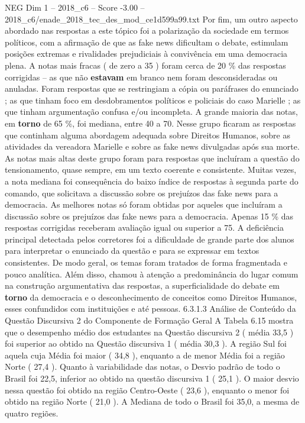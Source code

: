 \begin{textsample}{NEG Dim 1 – 2018\_c6 – Score -3.00 – 2018\_c6/enade\_2018\_tec\_des\_mod\_ce1d599a99.txt}
Por fim, um outro aspecto abordado nas respostas a este tópico foi a polarização da sociedade em termos políticos, com a afirmação de que as fake news dificultam o debate, estimulam posições extremas e rivalidades prejudiciais à convivência em uma democracia plena.
A notas mais fracas ( de zero a 35 ) foram cerca de 20 \% das respostas corrigidas – as que não \textbf{estavam} em branco nem foram desconsideradas ou anuladas.
Foram respostas que se restringiam a cópia ou paráfrases do enunciado ; as que tinham foco em desdobramentos políticos e policiais do caso Marielle ; as que tinham argumentação confusa e/ou incompleta.
A grande maioria das notas, em \textbf{torno} de 65 \%, foi mediana, entre 40 a 70.
Nesse grupo ficaram as respostas que continham alguma abordagem adequada sobre Direitos Humanos, sobre as atividades da vereadora Marielle e sobre as fake news divulgadas após sua morte.
As notas mais altas deste grupo foram para respostas que incluíram a questão do tensionamento, quase sempre, em um texto coerente e consistente.
Muitas vezes, a nota mediana foi consequência do baixo índice de respostas à segunda parte do comando, que solicitava a discussão sobre os prejuízos das fake news para a democracia.
As melhores notas só foram obtidas por aqueles que incluíram a discussão sobre os prejuízos das fake news para a democracia.
Apenas 15 \% das respostas corrigidas receberam avaliação igual ou superior a 75.
A deficiência principal detectada pelos corretores foi a dificuldade de grande parte dos alunos para interpretar o enunciado da questão e para se expressar em textos consistentes.
De modo geral, os temas foram tratados de forma fragmentada e pouco analítica.
Além disso, chamou à atenção a predominância do lugar comum na construção argumentativa das respostas, a superficialidade do debate em \textbf{torno} da democracia e o desconhecimento de conceitos como Direitos Humanos, esses confundidos com instituições e até pessoas. 6.3.1.3 Análise de Conteúdo da Questão Discursiva 2 do Componente de Formação Geral A Tabela 6.15 mostra que o desempenho médio dos estudantes na Questão discursiva 2 ( média 33,5 ) foi superior ao obtido na Questão discursiva 1 ( média 30,3 ).
A região Sul foi aquela cuja Média foi maior ( 34,8 ), enquanto a de menor Média foi a região Norte ( 27,4 ).
Quanto à variabilidade das notas, o Desvio padrão de todo o Brasil foi 22,5, inferior ao obtido na questão discursiva 1 ( 25,1 ).
O maior desvio nessa questão foi obtido na região Centro-Oeste ( 23,6 ), enquanto o menor foi obtido na região Norte ( 21,0 ).
A Mediana de todo o Brasil foi 35,0, a mesma de quatro regiões.

\end{textsample}

